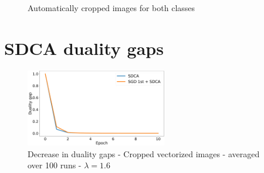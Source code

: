 \documentclass[10pt,a4paper]{article}
\begin{document}
\begin{figure}[!htb]
  \centering
  \hfill
  \caption{Automatically cropped images for both classes}\label{cropped}
\end{figure}

\newpage

\FloatBarrier

\section{SDCA duality gaps}

\begin{figure}[!htb]
	\centering
	\includegraphics[width=0.55\textwidth]{Graphs/duality_original3_mc100.pdf}
  \caption{Decrease in duality gaps - Cropped vectorized images - averaged over 100 runs - $\lambda = 1.6$}\label{find_centre}
\end{figure}
\end{document}
